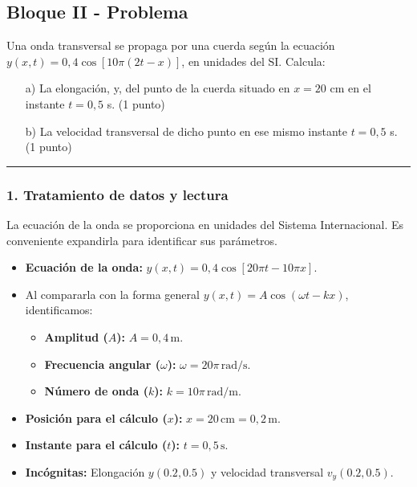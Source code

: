 \newpage

\subsection{Bloque II - Problema}
\label{subsec:A2_2013_jul_ext}

\begin{cajaenunciado}
Una onda transversal se propaga por una cuerda según la ecuación $y(x,t)=0,4\cos[10\pi(2t-x)]$, en unidades del SI. Calcula:
\begin{enumerate}
    \item[a)] La elongación, y, del punto de la cuerda situado en $x=20$ cm en el instante $t=0,5$ s. (1 punto)
    \item[b)] La velocidad transversal de dicho punto en ese mismo instante $t=0,5$ s. (1 punto)
\end{enumerate}
\end{cajaenunciado}
\hrule

\subsubsection*{1. Tratamiento de datos y lectura}
La ecuación de la onda se proporciona en unidades del Sistema Internacional. Es conveniente expandirla para identificar sus parámetros.
\begin{itemize}
    \item \textbf{Ecuación de la onda:} $y(x,t) = 0,4\cos[20\pi t - 10\pi x]$.
    \item Al compararla con la forma general $y(x,t) = A\cos(\omega t - kx)$, identificamos:
        \begin{itemize}
            \item \textbf{Amplitud ($A$):} $A = 0,4\,\text{m}$.
            \item \textbf{Frecuencia angular ($\omega$):} $\omega = 20\pi\,\text{rad/s}$.
            \item \textbf{Número de onda ($k$):} $k = 10\pi\,\text{rad/m}$.
        \end{itemize}
    \item \textbf{Posición para el cálculo ($x$):} $x = 20\,\text{cm} = 0,2\,\text{m}$.
    \item \textbf{Instante para el cálculo ($t$):} $t = 0,5\,\text{s}$.
    \item \textbf{Incógnitas:} Elongación $y(0.2, 0.5)$ y velocidad transversal $v_y(0.2, 0.5)$.
\end{itemize}

